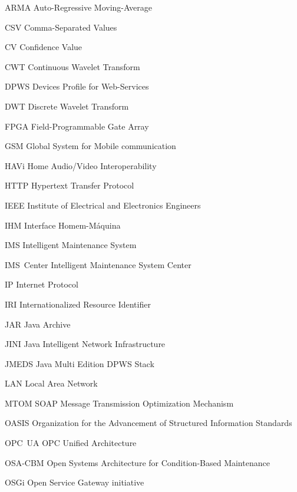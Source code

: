   {ARMA}
  {Auto-Regressive Moving-Average}

  {CSV}
  {Comma-Separated Values}

  {CV}
  {Confidence Value}

  {CWT}
  {Continuous Wavelet Transform}

  {DPWS}
  {Devices Profile for Web-Services}

  {DWT}
  {Discrete Wavelet Transform}

  {FPGA}
  {Field-Programmable Gate Array}

  {GSM}
  {Global System for Mobile communication}

  {HAVi}
  {Home Audio/Video Interoperability}

  {HTTP}
  {Hypertext Transfer Protocol}

  {IEEE}
  {Institute of Electrical and Electronics Engineers}

  {IHM}
  {Interface Homem-Máquina}

  {IMS}
  {Intelligent Maintenance System}

  {IMS~Center}
  {Intelligent Maintenance System Center}

  {IP}
  {Internet Protocol}

  {IRI}
  {Internationalized Resource Identifier}

  {JAR}
  {Java Archive}

  {JINI}
  {Java Intelligent Network Infrastructure}

  {JMEDS}
  {Java Multi Edition DPWS Stack}

  {LAN}
  {Local Area Network}

  {MTOM}
  {SOAP Message Transmission Optimization Mechanism}

  {OASIS}
  {Organization for the Advancement of Structured Information Standards}

  {OPC~UA}
  {OPC Unified Architecture}

  {OSA-CBM}
  {Open Systems Architecture for Condition-Based Maintenance}

  {OSGi}
  {Open Service Gateway initiative}

